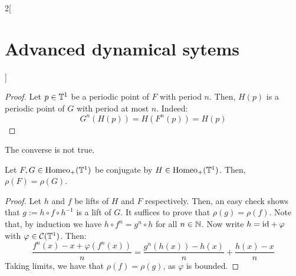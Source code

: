 \documentclass[../../../main_math.tex]{subfiles}
\begin{document}
\begin{multicols}{2}[\section{Advanced dynamical sytems}]
\begin{lemma}
  \end{lemma}
  \begin{proof}
    Let $p\in \mathbb{T}^1$ be a periodic point of $F$ with period $n$. Then, $H(p)$ is a periodic point of $G$ with period at most $n$. Indeed:
    $$
      G^n(H(p))=H(F^n(p))=H(p)
    $$
  \end{proof}
  \begin{remark}
    The converse is not true.
  \end{remark}
  \begin{theorem}
    Let $F,G\in\mathrm{Homeo}_+(\mathbb{T}^1)$ be conjugate by $H\in \mathrm{Homeo}_+(\mathbb{T}^1)$. Then, $\rho(F)=\rho(G)$.
  \end{theorem}
  \begin{proof}
    Let $h$ and $f$ be lifts of $H$ and $F$ respectively. Then, an easy check shows that $g:=h\circ f\circ h^{-1}$ is a lift of $G$. It suffices to prove that $\rho(g)=\rho(f)$. Note that, by induction we have $h\circ f^n=g^n\circ h$ for all $n\in\mathbb{N}$. Now write $h=\mathrm{id} + \varphi$ with $\varphi\in \mathcal{C}(\mathbb{T}^1)$. Then:
    \begin{equation*}
      \frac{f^n(x)-x+\varphi(f^n(x))}{n}= \frac{g^n(h(x))-h(x)}{n}+\frac{h(x)-x}{n}
    \end{equation*}
    Taking limits, we have that $\rho(f)=\rho(g)$, as $\varphi$ is bounded.
  \end{proof}

\end{multicols}
\end{document}
